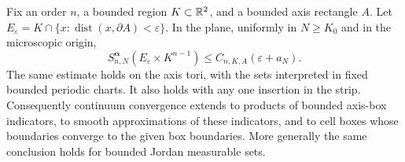 \begin{lemma}
\label{lem:boundary-strips}
Fix an order $n$, a bounded region $K\subset\mathbb R^2$, and a bounded axis
rectangle $A$.  Let
$E_\varepsilon=K\cap\{x:\operatorname{dist}(x,\partial A)<\varepsilon\}$.
In the plane, uniformly in $N\ge K_0$ and in the microscopic origin,
\begin{equation}
 S_{n,N}^{\boldsymbol\alpha}
       (E_\varepsilon\times K^{n-1})
       \le C_{n,K,A}(\varepsilon+a_N).
 \label{eq:boundary-strip-bound}
\end{equation}
The same estimate holds on the axis tori, with the sets interpreted in
fixed bounded periodic charts.  It also holds with any one insertion
in the strip.  Consequently continuum convergence extends to products
of bounded axis-box indicators, to smooth approximations of these
indicators, and to cell boxes whose boundaries converge to the given
box boundaries.  More generally the same conclusion holds for bounded
Jordan measurable sets.
\end{lemma}


